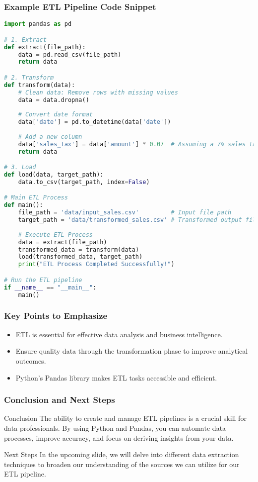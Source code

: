 \documentclass[aspectratio=169]{beamer}
\begin{document}
\begin{frame}[fragile]
    \frametitle{Example ETL Pipeline Code Snippet}
    \begin{lstlisting}[language=Python]
import pandas as pd

# 1. Extract
def extract(file_path):
    data = pd.read_csv(file_path)
    return data

# 2. Transform
def transform(data):
    # Clean data: Remove rows with missing values
    data = data.dropna()
    
    # Convert date format
    data['date'] = pd.to_datetime(data['date'])
    
    # Add a new column
    data['sales_tax'] = data['amount'] * 0.07  # Assuming a 7% sales tax
    return data

# 3. Load
def load(data, target_path):
    data.to_csv(target_path, index=False)

# Main ETL Process
def main():
    file_path = 'data/input_sales.csv'         # Input file path
    target_path = 'data/transformed_sales.csv' # Transformed output file path
    
    # Execute ETL Process
    data = extract(file_path)
    transformed_data = transform(data)
    load(transformed_data, target_path)
    print("ETL Process Completed Successfully!")

# Run the ETL pipeline
if __name__ == "__main__":
    main()
    \end{lstlisting}
\end{frame}

\begin{frame}
    \frametitle{Key Points to Emphasize}
    \begin{itemize}
        \item ETL is essential for effective data analysis and business intelligence.
        \item Ensure quality data through the transformation phase to improve analytical outcomes.
        \item Python's Pandas library makes ETL tasks accessible and efficient.
    \end{itemize}
\end{frame}

\begin{frame}
    \frametitle{Conclusion and Next Steps}
    \begin{block}{Conclusion}
        The ability to create and manage ETL pipelines is a crucial skill for data professionals. 
        By using Python and Pandas, you can automate data processes, improve accuracy, and focus on deriving insights from your data.
    \end{block}
    
    \begin{block}{Next Steps}
        In the upcoming slide, we will delve into different data extraction techniques to broaden our understanding of the sources we can utilize for our ETL pipeline.
    \end{block}
\end{frame}
\end{document}
